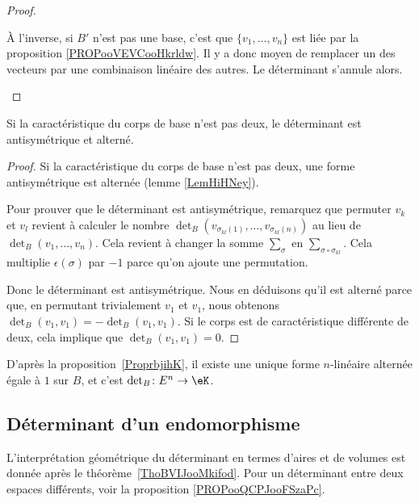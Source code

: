 \begin{proof}
\begin{subproof}
		À l'inverse, si \( B'\) n'est pas une base, c'est que \( \{ v_1,\ldots, v_n \}\) est liée par la proposition \ref{PROPooVEVCooHkrldw}. Il y a donc moyen de remplacer un des vecteurs par une combinaison linéaire des autres. Le déterminant s'annule alors.
	\end{subproof}
\end{proof}

\begin{proposition}     \label{PROPooXNLDooGGkHpd}
	Si la caractéristique du corps de base n'est pas deux, le déterminant est antisymétrique et alterné.
\end{proposition}

\begin{proof}
	Si la caractéristique du corps de base n'est pas deux, une forme antisymétrique est alternée (lemme \ref{LemHiHNey}).

	Pour prouver que le déterminant est antisymétrique, remarquez que permuter \( v_k\) et \( v_l\) revient à calculer le nombre \( \det_B( v_{\sigma_{kl}(1)},\ldots, v_{\sigma_{kl}(n)} )\) au lieu de \( \det_B(v_1,\ldots, v_n)\). Cela revient à changer la somme \( \sum_{\sigma}\) en \( \sum_{\sigma\circ\sigma_{kl}}\). Cela multiplie \( \epsilon(\sigma)\) par \( -1\) parce qu'on ajoute une permutation.

	Donc le déterminant est antisymétrique. Nous en déduisons qu'il est alterné parce que, en permutant trivialement \( v_1\) et \( v_1\), nous obtenons \( \det_B(v_1,v_1)=-\det_B(v_1,v_1)\). Si le corps est de caractéristique différente de deux, cela implique que \( \det_B(v_1,v_1)=0\).
\end{proof}

D'après la proposition~\ref{ProprbjihK}, il existe une unique forme \( n\)-linéaire alternée égale à \( 1\) sur \( B\), et c'est \( \det_B\colon E^n\to \eK\).

\subsection{Déterminant d'un endomorphisme}

L'interprétation géométrique du déterminant en termes d'aires et de volumes est donnée après le théorème~\ref{ThoBVIJooMkifod}. Pour un déterminant entre deux espaces différents, voir la proposition \ref{PROPooQCPJooFSzaPc}.

